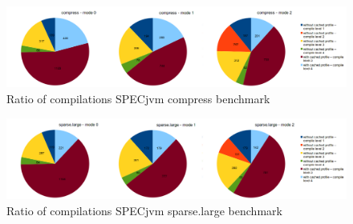 \begin{figure}[ht]
  \begin{center}
    \centering
    \includegraphics[width=1.0\textwidth]{figures/compress_compilations.png}
    \caption{Ratio of compilations SPECjvm compress benchmark}
    \label{f:compress_compilations}
  \end{center}
\end{figure}
\begin{figure}[ht]
  \begin{center}
    \centering
    \includegraphics[width=1.0\textwidth]{figures/sparselarge_compilations.png}
    \caption{Ratio of compilations SPECjvm sparse.large benchmark}
    \label{f:sparselarge_compilations}
  \end{center}
\end{figure}
\clearpage

